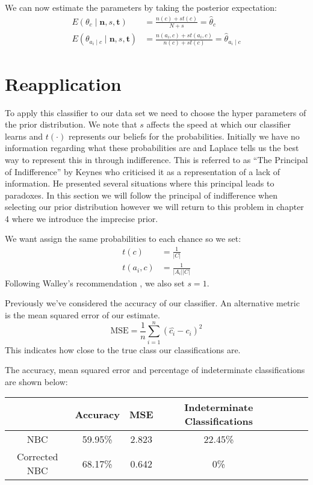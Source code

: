 We can now estimate the parameters by taking the posterior expectation:
\begin{align}
	E(\theta_c \mid \mathbf{n},s,\mathbf{t}) & = \frac{n(c) + st(c)}{N + s} = \hat{\theta}_c \\
	E(\theta_{a_i \mid c} \mid \mathbf{n},s,\mathbf{t}) & = \frac{n(a_i, c) + st(a_i, c)}{n(c) + st(c)} = \hat{\theta}_{a_i \mid c}
\end{align}

\section{Reapplication}

To apply this classifier to our data set we need to choose the hyper parameters of the prior distribution.
We note that $s$ affects the speed at which our classifier learns and $t(\cdot)$ represents our beliefs for the probabilities.
Initially we have no information regarding what these probabilities are and Laplace tells us \cite{laplace1812} the best way to represent this in through indifference.
This is referred to as ``The Principal of Indifference'' by Keynes \cite{Keynes21} who criticised it as a representation of a lack of information.
He presented several situations where this principal leads to paradoxes.
In this section we will follow the principal of indifference when selecting our prior distribution however we will return to this problem in chapter 4 where we introduce the imprecise prior.

We want assign the same probabilities to each chance so we set:
\begin{align}\label{initial prior}
	t(c) & = \frac{1}{|C|} \\
	t(a_i, c) & = \frac{1}{|A_i||C|}
\end{align}
Following Walley's recommendation \cite{Walley96}, we also set $s=1$.

Previously we've considered the accuracy of our classifier.
An alternative metric is the mean squared error of our estimate.
\begin{equation}
	\text{MSE} = \frac{1}{n}\sum_{i=1}^n(\hat{c_i} - c_i)^2
\end{equation}
This indicates how close to the true class our classifications are.

The accuracy, mean squared error and percentage of indeterminate classifications are shown below:
\begin{center}
	\begin{tabular}{ c|c c c c c c }
		              & Accuracy & MSE   & Indeterminate Classifications\\
		\hline
		NBC           & 59.95\%  & 2.823 & 22.45\% \\
		Corrected NBC & 68.17\%  & 0.642 & 0\%
	\end{tabular}
\end{center}

